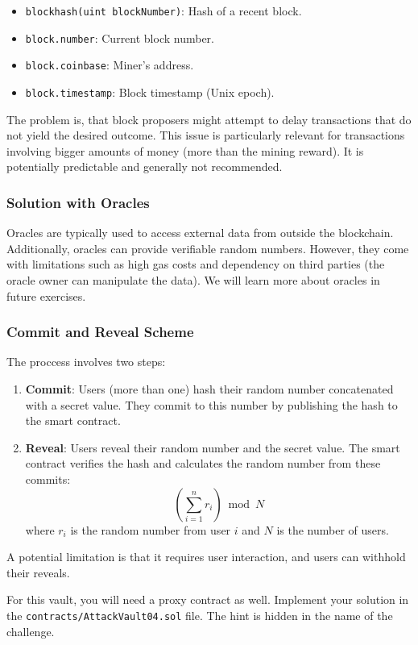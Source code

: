 \documentclass[12pt]{article}
\begin{document}
\begin{itemize}
    \item \texttt{blockhash(uint blockNumber)}: Hash of a recent block.
    \item \texttt{block.number}: Current block number.
    \item \texttt{block.coinbase}: Miner’s address.
    \item \texttt{block.timestamp}: Block timestamp (Unix epoch).
\end{itemize}

\noindent
The problem is, that block proposers might attempt to delay transactions that do not yield the desired outcome. This issue is particularly relevant for transactions involving bigger amounts of money (more than the mining reward). It is potentially predictable and generally not recommended.

\subsubsection*{Solution with Oracles} Oracles are typically used to access external data from outside the blockchain. Additionally, oracles can provide verifiable random numbers. However, they come with limitations such as high gas costs and dependency on third parties (the oracle owner can manipulate the data). We will learn more about oracles in future exercises.

\subsubsection*{Commit and Reveal Scheme} The proccess involves two steps:
\begin{enumerate}
    \item \textbf{Commit}: Users (more than one) hash their random number concatenated with a secret value. They commit to this number by publishing the hash to the smart contract.
    \item \textbf{Reveal}: Users reveal their random number and the secret value. The smart contract verifies the hash and calculates the random number from these commits:
    \[
    \left( \sum_{i=1}^{n} r_i \right) \bmod N
    \]
    where $r_i$ is the random number from user $i$ and $N$ is the number of users.
\end{enumerate}
\noindent
A potential limitation is that it requires user interaction, and users can withhold their reveals.

\medskip
\noindent
For this vault, you will need a proxy contract as well. Implement your solution in the \texttt{contracts/AttackVault04.sol} file. The hint is hidden in the name of the challenge.
\end{document}
